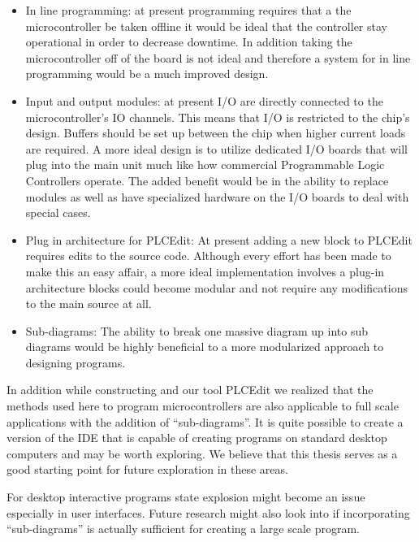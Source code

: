 \begin{itemize}
	\item In line programming: at present programming requires that a the microcontroller be taken offline it would be ideal that the controller stay operational in order to decrease downtime. In addition taking the microcontroller off of the board is not ideal and therefore a system for in line programming would be a much improved design.
	\item Input and output modules: at present I/O are directly connected to the microcontroller's IO channels. This means that I/O is restricted to the chip's design. Buffers should be set up between the chip when higher current loads are required. A more ideal design is to utilize dedicated I/O boards that will plug into the main unit much like how commercial Programmable Logic Controllers operate. The added benefit would be in the ability to replace modules as well as have specialized hardware on the I/O boards to deal with special cases.
	\item Plug in architecture for PLCEdit: At present adding a new block to PLCEdit requires edits to the source code. Although every effort has been made to make this an easy affair, a more ideal implementation involves a plug-in architecture blocks could become modular and not require any modifications to the main source at all.
	\item Sub-diagrams: The ability to break one massive diagram up into sub diagrams would be highly beneficial to a more modularized approach to designing programs.
\end{itemize}

In addition while constructing \plccharts and our tool PLCEdit we realized that the methods used here to program microcontrollers are also applicable to full scale applications with the addition of ``sub-diagrams''. It is quite possible to create a version of the IDE that is capable of creating programs on standard desktop computers and may be worth exploring. We believe that this thesis serves as a good starting point for future exploration in these areas.

For desktop interactive programs state explosion might become an issue especially in user interfaces. Future research might also look into if incorporating ``sub-diagrams'' is actually sufficient for creating a large scale program.